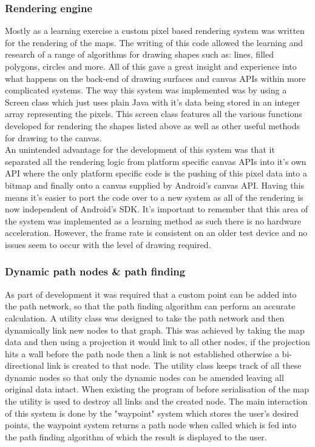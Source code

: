 \subsubsection{Rendering engine}
Mostly as a learning exercise a custom pixel based rendering system was written for the rendering of the maps. The writing of this code allowed the learning and research of a range of algorithms for drawing shapes such as: lines, filled polygons, circles and more. All of this gave a great insight and experience into what happens on the back-end of drawing surfaces and canvas APIs within more complicated systems. The way this system was implemented was by using a Screen class which just uses plain Java with it's data being stored in an integer array representing the pixels. This screen class features all the various functions developed for rendering the shapes listed above as well as other useful methods for drawing to the canvas.\\

An unintended advantage for the development of this system was that it separated all the rendering logic from platform specific canvas APIs into it's own API where the only platform specific code is the pushing of this pixel data into a bitmap and finally onto a canvas supplied by Android's canvas API. Having this means it's easier to port the code over to a new system as all of the rendering is now independent of Android's SDK. It's important to remember that this area of the system was implemented as a learning method as such there is no hardware acceleration. However, the frame rate is consistent on an older test device and no issues seem to occur with the level of drawing required.

\subsubsection{Dynamic path nodes \& path finding}
As part of development it was required that a custom point can be added into the path network, so that the path finding algorithm can perform an accurate calculation. A utility class was designed to take the path network and then dynamically link new nodes to that graph. This was achieved by taking the map data and then using a projection it would link to all other nodes, if the projection hits a wall before the path node then a link is not established otherwise a bi-directional link is created to that node. The utility class keeps track of all these dynamic nodes so that only the dynamic nodes can be amended leaving all original data intact. When existing the program of before serialisation of the map the utility is used to destroy all links and the created node. The main interaction of this system is done by the "waypoint" system which stores the user's desired points, the waypoint system returns a path node when called which is fed into the path finding algorithm of which the result is displayed to the user.


